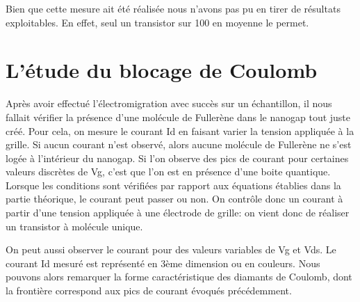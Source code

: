 Bien que cette mesure ait été réalisée nous n'avons pas pu en tirer de résultats exploitables. En effet, seul un transistor sur 100 en moyenne le permet.


\section{L'étude du blocage de Coulomb}
Après avoir effectué l'électromigration avec succès sur un échantillon, il nous fallait vérifier la présence d'une molécule de Fullerène dans le nanogap tout juste créé. Pour cela, on mesure le courant Id en faisant varier la tension appliquée à la grille. Si aucun courant n'est observé, alors aucune molécule de Fullerène ne s'est logée à l'intérieur du nanogap. Si l'on observe des pics de courant pour certaines valeurs discrètes de Vg, c'est que l'on est en présence d'une boite quantique. Lorsque les conditions sont vérifiées par rapport aux équations établies dans la partie théorique, le courant peut passer ou non. On contrôle donc un courant à partir d'une tension appliquée à une électrode de grille: on vient donc de réaliser un transistor à molécule unique.

On peut aussi observer le courant pour des valeurs variables de Vg et Vds. Le courant Id mesuré est représenté en 3ème dimension ou en couleurs. Nous pouvons alors remarquer la forme caractéristique des diamants de Coulomb, dont la frontière correspond aux pics de courant évoqués précédemment.
